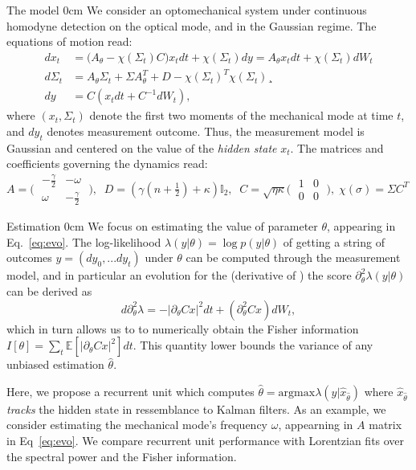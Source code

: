 \documentclass[xcolor={table}]{beamer}
\begin{document}
\begin{frame}[fragile=singleslide,t]
\begin{columns}[onlytextwidth,T]
\begin{column}{.47\textwidth}
\begin{block}{The model}
   0cm \dimexpr\linewidth-0cm\relax
We consider an optomechanical system under continuous homodyne detection on the optical mode, and in the Gaussian regime. The equations of motion read:
\begin{align}\label{eq:evo}
dx_t &= \big(A_\theta - \chi(\Sigma_t) C\big) x_t dt + \chi(\Sigma_t) dy = A_\theta x_t dt + \chi(\Sigma_t) dW_t \\
d\Sigma_t &= A_\theta \Sigma_t + \Sigma A_\theta^T + D - \chi(\Sigma_t)^T \chi(\Sigma_t) \nonumber¸\\
dy &= C(x_tdt + C^{-1}dW_t), \nonumber
\end{align}
where $(x_t,\Sigma_t)$ denote the first two moments of the mechanical mode at time $t$, and $dy_t$ denotes measurement outcome. Thus, the measurement model is Gaussian and centered on the value of the \textit{hidden state} $x_t$. The matrices and coefficients governing the dynamics read: {\normalsize$A = \Big(\;\begin{matrix}-\frac{\gamma}{2}& -\omega\\\omega & -\frac{\gamma}{2}\end{matrix}\;\Big), \; \; D = (\gamma (n + \frac{1}{2}) + \kappa )\mathbb{I}_2, \; \; C = \sqrt{\eta \kappa} \Big( \; \begin{matrix} 1 & 0 \\ 0 & 0 \end{matrix}\;\Big), \; \chi(\sigma) = \Sigma C^T $}
\end{block}
\begin{block}{Estimation}
   0cm \dimexpr\linewidth-0cm\relax
  We focus on estimating the value of parameter $\theta$, appearing in Eq.~\eqref{eq:evo}. The log-likelihood $\lambda(y|\theta) = \log p(y|\theta)$ of getting a string of outcomes $y= (dy_0, ... dy_t)$ under $\theta$ can be computed through the measurement model, and in particular an evolution for the (derivative of ) the score $\partial^2_\theta \lambda(y|\theta)$ can be derived as
\begin{equation*}
d \partial^2_\theta \lambda = - |\partial_\theta C x| ^2 dt + (\partial_\theta^2 C x) dW_t,
\end{equation*}which in turn allows us to to numerically obtain the Fisher information $I[\theta] = \sum_t \mathbb{E}[|\partial_\theta C x|^2] dt$. This quantity lower bounds the variance of any unbiased estimation $\hat{\theta}$.

Here, we propose a recurrent unit which computes $\hat{\theta} = \text{argmax}\lambda(y|\hat{x}_{\hat{\theta}})$ where $\hat{x}_{\hat{\theta}}$ \textit{tracks} the hidden state in ressemblance to Kalman filters. As an example, we consider estimating the mechanical mode's frequency $\omega$, appearning in $A$ matrix in Eq~\eqref{eq:evo}. We compare recurrent unit performance with  Lorentzian fits over the spectral power and the Fisher information.


\end{block}
\end{column}
\end{columns}
\end{frame}
\end{document}
